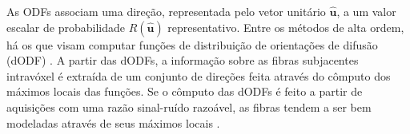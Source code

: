 \documentclass[
    12pt,                %
    oneside,            %
    a4paper,            %
    english,            %
    french,                %
    spanish,            %
    brazil                %
    ]{abntex2}
\begin{document}


%



As ODFs associam uma direção, representada pelo vetor unitário $\mathbf{\hat{u}}$, a um valor escalar de probabilidade $R(\mathbf{\hat{u}})$ representativo. Entre os métodos de alta ordem, há os que visam computar funções de distribuição de orientações de difusão (dODF) \cite{TuchQBall2004, wedeen2005, yeh2010}. A partir das dODFs, a informação sobre as fibras subjacentes intravóxel é extraída de um conjunto de direções feita através do cômputo dos máximos locais das funções. Se o cômputo das dODFs é feito a partir de aquisições com uma razão sinal-ruído razoável, as fibras tendem a ser bem modeladas através de seus máximos locais \cite{fillard2011}.
\end{document}
